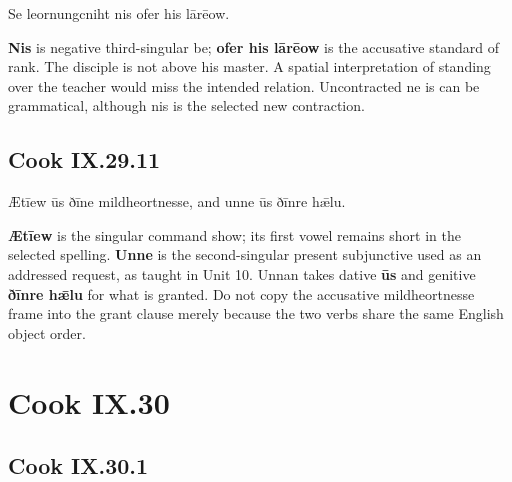 \par\begin{minipage}{\linewidth}\raggedright
Se leornungcniht nis ofer his lārēow.

\textbf{Nis} is negative third-singular be; \textbf{ofer his lārēow} is the accusative standard of rank. The disciple is not above his master. A spatial interpretation of standing over the teacher would miss the intended relation. Uncontracted ne is can be grammatical, although nis is the selected new contraction.

\end{minipage}\par\addvspace{4pt}

\subsection*{Cook IX.29.11}

\par\begin{minipage}{\linewidth}\raggedright
Ætīew ūs ðīne mildheortnesse, and unne ūs ðīnre hǣlu.

\textbf{Ætīew} is the singular command show; its first vowel remains short in the selected spelling. \textbf{Unne} is the second-singular present subjunctive used as an addressed request, as taught in Unit 10. Unnan takes dative \textbf{ūs} and genitive \textbf{ðīnre hǣlu} for what is granted. Do not copy the accusative mildheortnesse frame into the grant clause merely because the two verbs share the same English object order.

\end{minipage}\par\addvspace{4pt}

\section*{Cook IX.30}

\subsection*{Cook IX.30.1}

